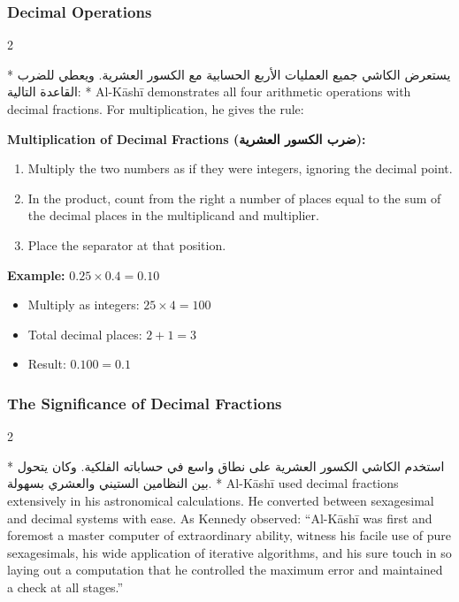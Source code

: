 \documentclass[11pt,a4paper]{article}
\newcommand{\ar}[1]{\arabicfont\beginR #1\endR}
\newenvironment{bilingual}{%
  \vspace{0.3em}%
  \begin{paracol}{2}%
}{%
  \end{paracol}%
  \vspace{0.3em}%
}
\newenvironment{mathalgo}{%
  \par\vspace{0.3cm}
  \begin{framed}
  \setlength{\parindent}{0pt}
}{%
  \end{framed}
  \par\vspace{0.3cm}
}
\begin{document}
\subsubsection{Decimal Operations}

\begin{bilingual}
\switchcolumn[0]*
\ar{يستعرض الكاشي جميع العمليات الأربع الحسابية مع الكسور العشرية. ويعطي للضرب القاعدة التالية:}
\switchcolumn[1]*
Al-K\=ash\=i demonstrates all four arithmetic operations with decimal
fractions. For multiplication, he gives the rule:
\end{bilingual}

\begin{mathalgo}
\textbf{Multiplication of Decimal Fractions (\ar{ضرب الكسور العشرية}):}
\begin{enumerate}[nosep]
  \item Multiply the two numbers as if they were integers, ignoring the
  decimal point.
  \item In the product, count from the right a number of places equal to
  the sum of the decimal places in the multiplicand and multiplier.
  \item Place the separator at that position.
\end{enumerate}

\textbf{Example:} $0.25 \times 0.4 = 0.10$
\begin{itemize}[nosep]
  \item Multiply as integers: $25 \times 4 = 100$
  \item Total decimal places: $2 + 1 = 3$
  \item Result: $0.100 = 0.1$
\end{itemize}
\end{mathalgo}

\subsubsection{The Significance of Decimal Fractions}

\begin{bilingual}
\switchcolumn[0]*
\ar{استخدم الكاشي الكسور العشرية على نطاق واسع في حساباته الفلكية. وكان يتحول بين النظامين الستيني والعشري بسهولة.}
\switchcolumn[1]*
Al-K\=ash\=i used decimal fractions extensively in his astronomical
calculations. He converted between sexagesimal and decimal systems with
ease. As Kennedy observed: ``Al-K\=ash\=i was first and foremost a master
computer of extraordinary ability, witness his facile use of pure
sexagesimals, his wide application of iterative algorithms, and his sure
touch in so laying out a computation that he controlled the maximum error
and maintained a check at all stages.''
\end{bilingual}
\end{document}
